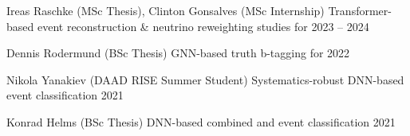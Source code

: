 


\begin{cvhonors}

  \cvhonor
    {Ireas Raschke \textmd{(MSc Thesis)}, Clinton Gonsalves \textmd{(MSc Internship)}} %
    {%
      \newline
      Transformer-based event reconstruction \& neutrino reweighting studies for \ttHWW  %
    } %
    {} %
    {2023 -- 2024} %


  \cvhonor
    {Dennis Rodermund \textmd{(BSc Thesis)}} %
    {%
      \newline
      GNN-based truth b-tagging for \ttHbb  %
    } %
    {} %
    {2022} %

  \cvhonor
    {Nikola Yanakiev \textmd{(DAAD RISE Summer Student)}} %
    {%
      \newline
      Systematics-robust DNN-based \ttHbb event classification  %
    } %
    {} %
    {2021} %

  \cvhonor
    {Konrad Helms \textmd{(BSc Thesis)}} %
    {%
      \newline
      DNN-based combined \ttHbb and \tHbb event classification  %
    } %
    {} %
    {2021} %

\end{cvhonors}

